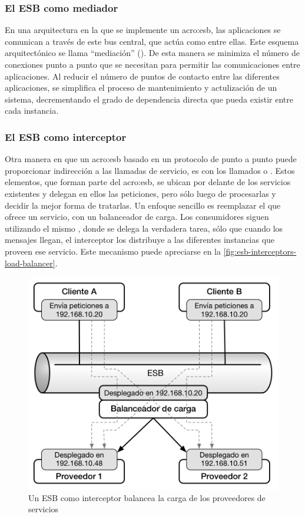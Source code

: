 \subsubsection{El ESB como mediador}

En una arquitectura en la que se implemente un \gls{acro:esb}, las aplicaciones se comunican a través de este bus central, que actúa como  entre ellas. Este esquema arquitectónico se llama ``mediación'' (). De esta manera se minimiza el número de conexiones punto a punto que se necesitan para permitir las comunicaciones entre aplicaciones. Al reducir el número de puntos de contacto entre las diferentes aplicaciones, se simplifica el proceso de mantenimiento y actulización de un sistema, decrementando el grado de dependencia directa que pueda existir entre cada instancia.


\subsubsection{El ESB como interceptor}

Otra manera en que un \gls{acro:esb} basado en un protocolo de punto a punto puede proporcionar indirección a las llamadas de servicio, es con los llamados  o . Estos elementos, que forman parte del \gls{acro:esb}, se ubican por delante de los servicios existentes y delegan en ellos las peticiones, pero sólo luego de procesarlas y decidir la mejor forma de tratarlas. Un enfoque sencillo es reemplazar el  que ofrece un servicio, con un balanceador de carga. Los consumidores siguen utilizando el mismo , donde se delega la verdadera tarea, sólo que cuando los mensajes llegan, el interceptor los distribuye a las diferentes instancias que proveen ese servicio\cite[p.~52]{josuttis2007}. Este mecanismo puede apreciarse en la \autoref{fig:esb-interceptors-load-balancer}.

\begin{figure}[H]
  \includegraphics[width=\linewidth]{src/images/02-capitulo-2/esb-interceptor.png}
  \caption{Un ESB como interceptor balancea la carga de los proveedores de servicios}
  \label{fig:esb-interceptors-load-balancer}
\end{figure}
